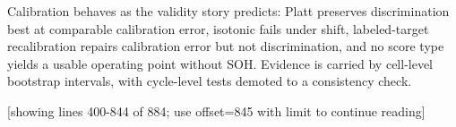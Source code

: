 Calibration behaves as the validity story predicts: Platt preserves discrimination best at comparable calibration error, isotonic fails under shift, labeled-target recalibration repairs calibration error but not discrimination, and no score type yields a usable operating point without SOH. Evidence is carried by cell-level bootstrap intervals, with cycle-level tests demoted to a consistency check.

[showing lines 400-844 of 884; use offset=845 with limit to continue reading]